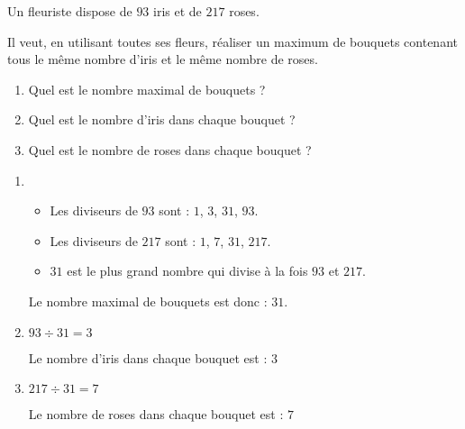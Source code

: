 \begin{exercice*}
    Un fleuriste dispose de $93$ iris et de $217$ roses.

    Il veut, en utilisant toutes ses fleurs, réaliser un maximum de bouquets contenant tous le même nombre d'iris et le même nombre de roses. 
    \begin{enumerate}
        \item Quel est le nombre maximal de bouquets ?
        \item Quel est le nombre d'iris dans chaque bouquet ?
        \item Quel est le nombre de roses dans chaque bouquet ?
    \end{enumerate}
\end{exercice*}
\begin{corrige}
    \begin{enumerate}
        \item 
        \begin{itemize}
            \item Les diviseurs de $93$ sont : $1$, $3$, $31$, $93$.
            \item Les diviseurs de $217$ sont : $1$, $7$, $31$, $217$.
            \item $31$ est le plus grand nombre qui divise à la fois $93$ et $217$.
        \end{itemize}
        Le nombre maximal de bouquets est donc : $31$.

        \item $93 \div 31 = 3$
     
        Le nombre d'iris dans chaque bouquet est : $3$
        \item $217 \div 31 = 7$
    
        Le nombre de roses dans chaque bouquet est : $7$
    \end{enumerate}
       
\end{corrige}

